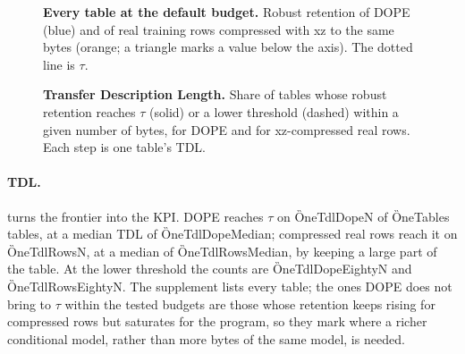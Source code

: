 \begin{figure}[t]
  \centering
  \caption{\textbf{Every table at the default budget.} Robust retention of DOPE (blue) and of real
  training rows compressed with xz to the same bytes (orange; a triangle marks a value below the axis).
  The dotted line is $\tau$.}
  \label{fig:tables}
\end{figure}

\begin{figure}[t]
  \centering
  \caption{\textbf{Transfer Description Length.} Share of tables whose robust retention reaches $\tau$
  (solid) or a lower threshold (dashed) within a given number of bytes, for DOPE and for xz-compressed
  real rows. Each step is one table's TDL.}
  \label{fig:coverage}
\end{figure}

\paragraph{TDL.}
 turns the frontier into the KPI. DOPE reaches $\tau$ on \G{OneTdlDopeN} of
\G{OneTables} tables, at a median TDL of \G{OneTdlDopeMedian}; compressed real rows reach it on
\G{OneTdlRowsN}, at a median of \G{OneTdlRowsMedian}, by keeping a large part of the table. At the
lower threshold the counts are \G{OneTdlDopeEightyN} and \G{OneTdlRowsEightyN}. The supplement lists
every table; the ones DOPE does not bring to $\tau$ within the tested budgets are those whose
retention keeps rising for compressed rows but saturates for the program, so they mark where a richer
conditional model, rather than more bytes of the same model, is needed.

\begin{table}[t]
\centering
\caption{\textbf{Ablations at the default budget and seed.} Each row removes or changes one component
of DOPE; the last column counts the tables on which the variant beats, ties or trails the full program.}
\label{tab:ablation}
\small
{}
\end{table}

